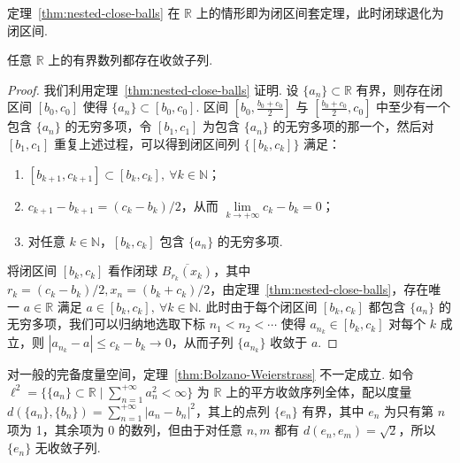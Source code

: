 \documentclass[../main.tex]{subfiles}
\begin{document}
\begin{remark}
    定理~\ref{thm:nested-close-balls} 在 $\mathbb R$ 上的情形即为闭区间套定理，此时闭球退化为闭区间. 
\end{remark}

\begin{theorem} \label{thm:Bolzano-Weierstrass} 
    任意 $\mathbb R$ 上的有界数列都存在收敛子列. 
\end{theorem}

\begin{proof}
    我们利用定理~\ref{thm:nested-close-balls} 证明. 设 $\{a_n\} \subset \mathbb R$ 有界，则存在闭区间 $[b_0, c_0]$ 使得 $\{a_n\} \subset [b_0, c_0]$. 区间 $[b_0, \frac{b_0 + c_0}{2}]$ 与 $[\frac{b_0 + c_0}{2}, c_0]$ 中至少有一个包含 $\{a_n\}$ 的无穷多项，令 $[b_1, c_1]$ 为包含 $\{a_n\}$ 的无穷多项的那一个，然后对 $[b_1, c_1]$ 重复上述过程，可以得到闭区间列 $\{[b_k, c_k]\}$ 满足：
    \begin{enumerate}[label=(\alph*)]
        \item $[b_{k + 1}, c_{k + 1}] \subset [b_k, c_k],\ \forall k \in \mathbb N$；
        \item $c_{k + 1} - b_{k + 1} = (c_k - b_k) / 2$，从而 $\lim\limits_{k \to +\infty} c_k - b_k = 0$；
        \item 对任意 $k \in \mathbb N$，$[b_k, c_k]$ 包含 $\{a_n\}$ 的无穷多项. 
    \end{enumerate}
    将闭区间 $[b_k, c_k]$ 看作闭球 $\overline{B_{r_k}(x_k)}$，其中 $r_k = (c_k - b_k) / 2, x_n = (b_k + c_k) / 2$，由定理~\ref{thm:nested-close-balls}，存在唯一 $a \in \mathbb R$ 满足 $a \in [b_k, c_k],\ \forall k \in \mathbb N$. 此时由于每个闭区间 $[b_k, c_k]$ 都包含 $\{a_n\}$ 的无穷多项，我们可以归纳地选取下标 $n_1 < n_2 < \cdots$ 使得 $a_{n_k} \in [b_k, c_k]$ 对每个 $k$ 成立，则 $|a_{n_k} - a| \leqslant c_k - b_k \to 0$，从而子列 $\{a_{n_k}\}$ 收敛于 $a$. 
\end{proof}

\begin{remark}
    对一般的完备度量空间，定理~\ref{thm:Bolzano-Weierstrass} 不一定成立. 如令 $\ell^2 = \{\{a_n\} \subset \mathbb R \mid \sum\limits_{n = 1}^{+\infty} a_n^2 < \infty\}$ 为 $\mathbb R$ 上的平方收敛序列全体，配以度量 $d(\{a_n\}, \{b_n\}) = \sum\limits_{n = 1}^{+\infty} |a_n - b_n|^2$，其上的点列 $\{e_n\}$ 有界，其中 $e_n$ 为只有第 $n$ 项为 1，其余项为 0 的数列，但由于对任意 $n, m$ 都有 $d(e_n, e_m) = \sqrt{2}$，所以 $\{e_n\}$ 无收敛子列. 
\end{remark}
\end{document}

